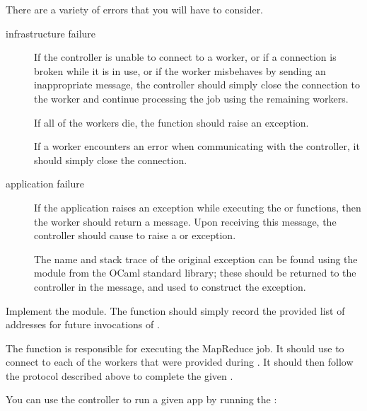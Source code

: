 \documentclass{pset}
\begin{document}
There are a variety of errors that you will have to consider.
\begin{description}
\item[infrastructure failure]
If the controller is unable to connect to a worker, or if a connection is broken
while it is in use, or if the worker misbehaves by sending an inappropriate
message, the controller should simply close the connection to the worker and
continue processing the job using the remaining workers.

If all of the workers die, the  function should raise an
 exception.

If a worker encounters an error when communicating with the controller, it
should simply close the connection.

\item[application failure]
If the application raises an exception while executing the  or
 functions, then the worker should return a 
message.  Upon receiving this message, the controller should cause
 to raise a  or  exception.

The name and stack trace of the original exception can be found using the
 module from the OCaml standard library; these should be returned
to the controller in the  message, and used to construct the
 exception.

\end{description}


Implement the  module.  The  function should
simply record the provided list of addresses for future invocations of
.

The  function is responsible for executing the MapReduce
job.  It should use  to connect to each of the workers that
were provided during .  It should then follow the protocol described
above to complete the given .

You can use the controller to run a given app by running the
:
\begin{ocaml}
\end{ocaml}

\end{document}
